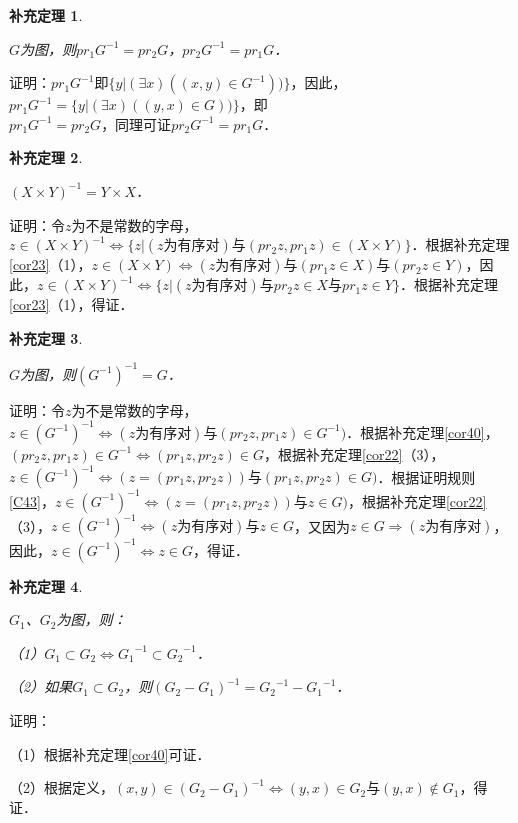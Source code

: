 \documentclass[12pt, a4paper, oneside]{book}
\newtheorem{cor}{补充定理}
\begin{document}
			\begin{cor}\label{cor42}
				\hfill\par
				$G$为图，则$pr_1G^{-1}=pr_2G$，$pr_2G^{-1}=pr_1G$．
			\end{cor}
			证明：$pr_1G^{-1}$即$\{y|(\exists x)((x, y)\in G ^{-1}))\}$，因此，$pr_1G^{-1}=\{y|(\exists x)((y, x)\in G))\}$，即\\$pr_1G^{-1}=pr_2G$，同理可证$pr_2G^{-1}=pr_1G$．
			
			\begin{cor}\label{cor43}
				\hfill\par
				$(X\times Y) ^{-1}=Y\times X$．
			\end{cor}
			证明：令$z$为不是常数的字母，$z\in (X\times Y)^{-1}\Leftrightarrow \{z|(z\text{为有序对})\text{与}(pr_2z,pr_1z)\in (X\times Y)\}$．根据补充定理\ref{cor23}（1），$z\in (X\times Y)\Leftrightarrow (z\text{为有序对})\text{与}(pr_1z\in X)\text{与}(pr_2z\in Y)$，因此，$z\in (X\times Y)^{-1}\Leftrightarrow \{z|(z\text{为有序对})\text{与}pr_2z\in X\text{与}pr_1z\in Y\}$．根据补充定理\ref{cor23}（1），得证．
			
			\begin{cor}\label{cor44}
				\hfill\par
				$G$为图，则$(G^{-1})^{-1}=G$．
			\end{cor}
			证明：令$z$为不是常数的字母，$z\in (G^{-1})^{-1}\Leftrightarrow (z\text{为有序对})\text{与}(pr_2z,pr_1z)\in G^{-1})$．根据补充定理\ref{cor40}，$(pr_2z,pr_1z)\in G^{-1}\Leftrightarrow (pr_1z,pr_2z)\in G$，根据补充定理\ref{cor22}（3），$z\in (G^{-1})^{-1}\Leftrightarrow (z=(pr_1z,pr_2z))\text{与}(pr_1z,pr_2z)\in G)$．根据证明规则\ref{C43}，$z\in (G^{-1})^{-1}\Leftrightarrow (z=(pr_1z,pr_2z))\text{与}z\in G)$，根据补充定理\ref{cor22}（3），$z\in (G^{-1})^{-1}\Leftrightarrow (z\text{为有序对})\text{与}z\in G$，又因为$z\in G\Rightarrow (z\text{为有序对})$，因此，$z\in (G^{-1})^{-1}\Leftrightarrow z\in G$，得证．
			
			\begin{cor}\label{cor45}
				\hfill\par
				$G_1$、$G_2$为图，则：
				\par
				（1）$G_1\subset G_2\Leftrightarrow {G_1}^{-1}\subset {G_2}^{-1}$．
				\par
				（2）如果$G_1\subset G_2$，则$(G_2-G_1)^{-1}= {G_2}^{-1}-{G_1}^{-1}$．
			\end{cor}
			证明：
			\par
			（1）根据补充定理\ref{cor40}可证．
			\par
			（2）根据定义，$(x, y)\in (G_2-G_1)^{-1}\Leftrightarrow (y, x)\in G_2\text{与}(y, x)\notin G_1$，得证．
\end{document}
